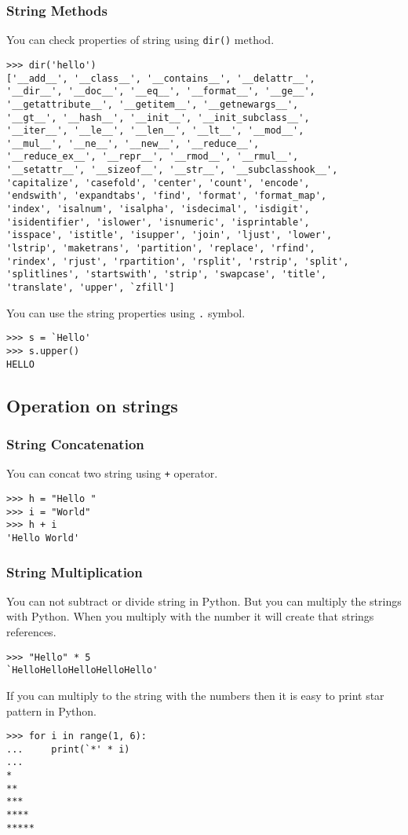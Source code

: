 \documentclass[letterpaper,12pt]{book}
\begin{document}
\subsubsection{String Methods}
You can check properties of string using \texttt{dir()} method.
\begin{verbatim}
>>> dir('hello')
['__add__', '__class__', '__contains__', '__delattr__', 
'__dir__', '__doc__', '__eq__', '__format__', '__ge__', 
'__getattribute__', '__getitem__', '__getnewargs__', 
'__gt__', '__hash__', '__init__', '__init_subclass__', 
'__iter__', '__le__', '__len__', '__lt__', '__mod__', 
'__mul__', '__ne__', '__new__', '__reduce__', 
'__reduce_ex__', '__repr__', '__rmod__', '__rmul__', 
'__setattr__', '__sizeof__', '__str__', '__subclasshook__',
'capitalize', 'casefold', 'center', 'count', 'encode',
'endswith', 'expandtabs', 'find', 'format', 'format_map',
'index', 'isalnum', 'isalpha', 'isdecimal', 'isdigit',
'isidentifier', 'islower', 'isnumeric', 'isprintable',
'isspace', 'istitle', 'isupper', 'join', 'ljust', 'lower',
'lstrip', 'maketrans', 'partition', 'replace', 'rfind',
'rindex', 'rjust', 'rpartition', 'rsplit', 'rstrip', 'split',
'splitlines', 'startswith', 'strip', 'swapcase', 'title',
'translate', 'upper', `zfill']
\end{verbatim}
You can use the string properties using \texttt{.} symbol.
\begin{verbatim}
>>> s = `Hello'
>>> s.upper()
HELLO
\end{verbatim}
\subsection{Operation on strings}
\subsubsection{String Concatenation}
You can concat two string using \texttt{+} operator.
\begin{verbatim}
>>> h = "Hello "
>>> i = "World"
>>> h + i
'Hello World'
\end{verbatim}
\subsubsection{String Multiplication}
You can not subtract or divide string in Python. But you can multiply the strings with Python. When you multiply with the number it will create that strings references.
\begin{verbatim}
>>> "Hello" * 5
`HelloHelloHelloHelloHello'
\end{verbatim}
If you can multiply to the string with the numbers then it is easy to print star pattern in Python.
\begin{verbatim}
>>> for i in range(1, 6):
...     print(`*' * i)
... 
*
**
***
****
*****
\end{verbatim}
\end{document}
